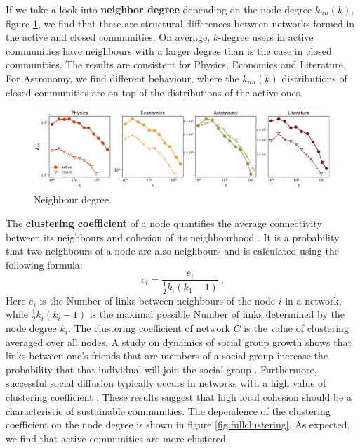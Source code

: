 If we take a look into \textbf{neighbor degree} depending on the node degree $k_{nn}(k)$, figure \ref{fig:fullneighdeg}, we find that there are structural differences between networks formed in the active and closed communities. On average, $k$-degree users in active communities have neighbours with a larger degree than is the case in closed communities. The results are consistent for Physics, Economics and Literature. For Astronomy, we find different behaviour, where the $k_{nn}(k)$ distributions of closed communities are on top of the distributions of the active ones. 

\begin{figure}[!ht]
	\centering
	\includegraphics[width=\linewidth]{figures/stackexchange/neighdeg_fullnet.pdf}
	\caption{Neighbour degree.}
	\label{fig:fullneighdeg}
\end{figure}

The \textbf{clustering coefficient} of a node quantifies the average connectivity between its neighbours and cohesion of its neighbourhood \cite{boccaletti2006complex}. It is a probability that two neighbours of a node are also neighbours and is calculated using the following formula:
\begin{equation}
c_{i}=\frac{e_{i}}{\frac{1}{2}k_{i}(k_{1}-1)} \ .
\label{eq:clust}
\end{equation}
Here $e_{i}$ is the Number of links between neighbours of the node $i$ in a network, while $\frac{1}{2}k_{i}(k_{i}-1)$ is the maximal possible Number of links determined by the node degree $k_{i}$. The clustering coefficient of network $C$ is the value of clustering averaged over all nodes. A study on dynamics of social group growth shows that links between one’s friends that are members of a social group increase the probability that that individual will join the social group \cite{backstrom2006group}. Furthermore, successful social diffusion typically occurs in networks with a high value of clustering coefficient \cite{centola2007cascade}. These results suggest that high local cohesion should be a characteristic of sustainable communities. The dependence of the clustering coefficient on the node degree is shown in figure \ref{fig:fullclustering}. As expected, we find that active communities are more clustered.

